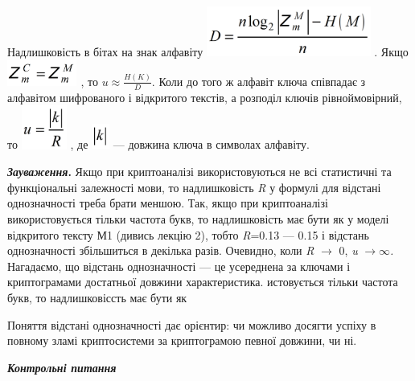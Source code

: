 Надлишковість в бітах на знак алфавіту 
\includegraphics[width=2.122in,height=0.65in]{crypt-img/crypt-img51.png} . Якщо
  \includegraphics[width=0.9047in,height=0.3311in]{crypt-img/crypt-img52.png} ,
 то   ${u\approx \frac{H(K)}{D}}$.  Коли до того ж алфавіт ключа співпадає з
алфавітом шифрованого і відкритого текстів, а розподіл ключів  рівноймовірний,
то  
\includegraphics[width=0.5862in,height=0.5665in]{crypt-img/crypt-img53.png} , 
де  
\includegraphics[width=0.2291in,height=0.3335in]{crypt-img/crypt-img54.png}  ---
довжина ключа в символах алфавіту.

\textbf{\textit{Зауваження}}\textbf{.} Якщо при криптоаналізі використовуються
не всі статистичні та функціональні залежності мови, то надлишковість
\textit{R}\textit{ }у формулі для відстані однозначності треба брати меншою.
Так, якщо при криптоаналізі використовується тільки частота букв, то
надлишковість має бути як у моделі відкритого тексту М1 (дивись лекцію 2),
тобто \textit{R}=0.13 --- 0.15  і відстань однозначності  збільшиться в декілька
разів.  Очевидно, коли  \textit{R} ${\rightarrow }$ 0,\textit{  u}
${\rightarrow \infty }$\textit{.  }Нагадаємо, що відстань однозначності --- це
усереднена за ключами і криптограмами достатньої  довжини характеристика. 
истовується тільки частота букв, то надлишковіссть має бути як

Поняття відстані однозначності дає орієнтир: чи можливо досягти успіху в повному
зламі криптосистеми за криптограмою певної довжини, чи ні.


\bigskip


\bigskip

{\centering\bfseries\itshape
Контрольні питання
\par}


\bigskip


\bigskip

